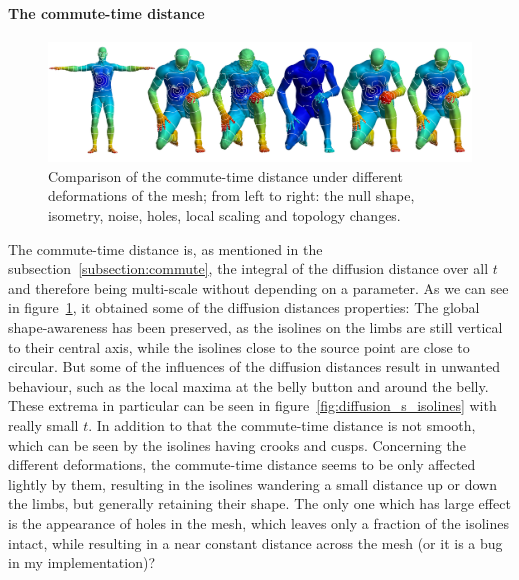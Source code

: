 \paragraph{The commute-time distance}
\begin{figure}[h]
	\centering
	\includegraphics[width = \textwidth]{../results/commute_time_isolines}
	\caption{Comparison of the commute-time distance under different deformations of the mesh; from left to right: the null shape, isometry, noise, holes, local scaling and topology changes.}
	\label{fig:commute_time_isolines}
\end{figure}
The commute-time distance is, as mentioned in the subsection~\ref{subsection:commute}, the integral of the diffusion distance  over all $t$ and therefore being multi-scale without depending on a parameter.
As we can see in figure~\ref{fig:commute_time_isolines}, it obtained some of the diffusion distances properties:
The global shape-awareness has been preserved, as the isolines on the limbs are still vertical to their central axis, while the isolines close to the source point are close to circular.
But some of the influences of the diffusion distances result in unwanted behaviour, such as the local maxima at the belly button and around the belly.
These extrema in particular can be seen in figure~\ref{fig:diffusion_s_isolines} with really small $t$.
In addition to that the commute-time distance is not smooth, which can be seen by the isolines having crooks and cusps.
Concerning the different deformations, the commute-time distance seems to be only affected lightly by them, resulting in the isolines wandering a small distance up or down the limbs, but generally retaining their shape.
The only one which has large effect is the appearance of holes in the mesh, which leaves only a fraction of the isolines intact, while resulting in a near constant distance across the mesh (or it is a bug in my implementation)?

